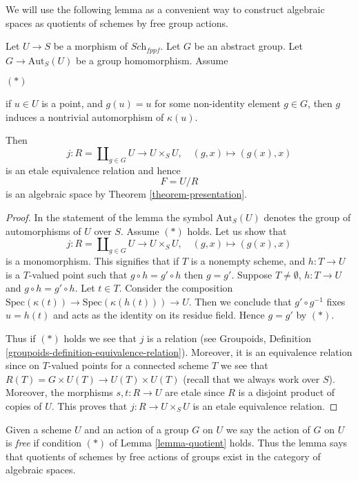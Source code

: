 \noindent
We will use the following lemma as a convenient way to construct
algebraic spaces as quotients of schemes by free group actions.

\begin{lemma}
\label{lemma-quotient}
Let $U \to S$ be a morphism of $\textit{Sch}_{fppf}$.
Let $G$ be an abstract group. Let $G \to \text{Aut}_S(U)$
be a group homomorphism. Assume
\begin{list}{$(*)$}{}
\item if $u \in U$ is a point, and $g(u) = u$
for some non-identity element $g \in G$, then $g$
induces a nontrivial automorphism of $\kappa(u)$.
\end{list}
Then
$$
j :
R = \coprod\nolimits_{g \in G} U
\longrightarrow
U \times_S U,
\quad
(g, x) \longmapsto (g(x), x)
$$
is an etale equivalence relation and hence
$$
F = U/R
$$
is an algebraic space by Theorem \ref{theorem-presentation}.
\end{lemma}

\begin{proof}
In the statement of the lemma the symbol $\text{Aut}_S(U)$ denotes
the group of automorphisms of $U$ over $S$.
Assume $(*)$ holds. Let us show that
$$
j :
R = \coprod\nolimits_{g \in G} U
\longrightarrow
U \times_S U,
\quad
(g, x) \longmapsto (g(x), x)
$$
is a monomorphism. This signifies that if $T$ is a nonempty
scheme, and $h : T \to U$ is a $T$-valued point such that
$g \circ h = g' \circ h$ then $g = g'$. Suppose
$T \not = \emptyset$, $h : T \to U$ and $g \circ h = g' \circ h$.
Let $t \in T$. Consider the composition
$\text{Spec}(\kappa(t)) \to \text{Spec}(\kappa(h(t))) \to U$.
Then we conclude that $g' \circ g^{-1}$ fixes $u = h(t)$ and
acts as the identity on its residue field. Hence $g = g'$ by $(*)$.

\medskip\noindent
Thus if $(*)$ holds we see that $j$ is a relation (see
Groupoids, Definition \ref{groupoids-definition-equivalence-relation}).
Moreover, it is an equivalence relation since on $T$-valued points
for a connected scheme $T$ we see that
$R(T) = G \times U(T) \to U(T) \times U(T)$ (recall that we always
work over $S$). Moreover, the morphisms $s, t : R \to U$ are etale
since $R$ is a disjoint product of copies of $U$.
This proves that $j : R \to U \times_S U$ is an etale equivalence relation.
\end{proof}

\noindent
Given a scheme $U$ and an action of a group $G$ on $U$ we say the action
of $G$ on $U$ is {\it free} if condition $(*)$ of Lemma \ref{lemma-quotient}
holds. Thus the lemma says that quotients of schemes by free actions
of groups exist in the category of algebraic spaces.

